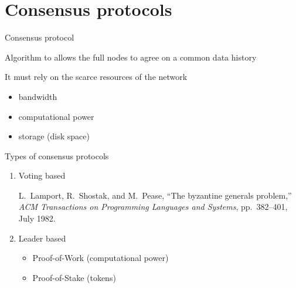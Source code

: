 \documentclass{beamer}
\begin{document}
\section{Consensus protocols}
\begin{frame}{Consensus protocol}
\begin{tcolorbox}[enhanced,drop shadow, title=Definition]
    Algorithm to allows the full nodes to agree on a common data history
\end{tcolorbox}
It must rely on the scarce resources of the network
\begin{itemize}
  \item bandwidth
  \item computational power
  \item storage (disk space)
\end{itemize}
\end{frame}
\begin{frame}{Types of consensus protocols}
\begin{enumerate}
  \item Voting based 
  \footnotesize
\begin{thebibliography}{1}

L.~Lamport, R.~Shostak, and M.~Pease, ``The byzantine generals problem,'' {\em
  ACM Transactions on Programming Languages and Systems}, pp.~382--401, July
  1982.

\end{thebibliography}
\normalsize
  \item Leader based
  \begin{itemize}
    \item Proof-of-Work (computational power)
    \item Proof-of-Stake (tokens)
  \end{itemize}
\end{enumerate}
\end{frame}
\end{document}
